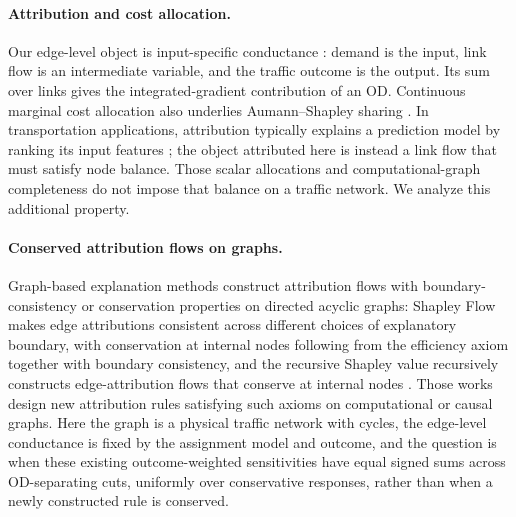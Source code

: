 \documentclass[a4paper,fleqn]{cas-sc}
\begin{document}
\paragraph{Attribution and cost allocation.}
Our edge-level object is input-specific conductance
\citep{dhamdhere2019important,lundstrom2022rigorous}: demand is the input,
link flow is an intermediate variable, and the traffic outcome is the output.
Its sum over links gives the integrated-gradient contribution of an OD.
Continuous marginal cost allocation also underlies Aumann--Shapley sharing
\citep{aumann1974values,billera1978internal}. In transportation
applications, attribution typically explains a prediction model by ranking
its input features \citep{sariyer2024leveraging,guo2024towards}; the object
attributed here is instead a link flow that must satisfy node balance.
Those scalar allocations and computational-graph completeness do not impose
that balance on a traffic network. We analyze this additional property.

\paragraph{Conserved attribution flows on graphs.}
Graph-based explanation methods construct attribution flows with
boundary-consistency or conservation properties on directed acyclic
graphs: Shapley Flow makes edge attributions consistent across
different choices of explanatory boundary, with conservation at
internal nodes following from the efficiency axiom together with
boundary consistency, and the recursive
Shapley value recursively constructs edge-attribution flows that
conserve at internal nodes \citep{wang2021shapleyflow,singal2021rsv}.
Those works design
new attribution rules satisfying such axioms on computational or causal
graphs. Here the graph is a physical traffic network with cycles, the
edge-level conductance is fixed by the assignment model and outcome,
and the question is when these existing outcome-weighted sensitivities
have equal signed sums across OD-separating cuts, uniformly over
conservative responses, rather than when a newly constructed rule is
conserved.
\end{document}
